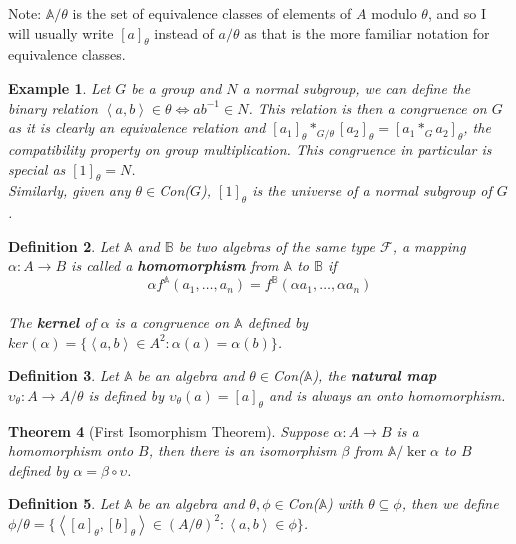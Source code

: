 \documentclass[12pt,a4paper]{article}
\newtheorem{theorem}{Theorem}[section]
\newtheorem{example}[theorem]{Example}
\newtheorem{definition}[theorem]{Definition}
\begin{document}
Note: $\mathbb{A}/\theta$ is the set of equivalence classes of elements of $A$ modulo $\theta$, and so I will usually write $[a]_\theta$ instead of $a/\theta$ as that is the more familiar notation for equivalence classes.

\begin{example}
Let $G$ be a group and $N$ a normal subgroup, we can define the binary relation $ \left<a,b\right> \in\theta\iff ab^{-1}\in N$.
This relation is then a congruence on $G$ as it is clearly an equivalence relation and $[a_1]_\theta*_{G/\theta}[a_2]_\theta=[a_1*_{G}a_2]_\theta$, the compatibility property on group multiplication. This congruence in particular is special as $[1]_\theta=N$.\\
Similarly, given any $\theta\in$Con($G$), $[1]_\theta$ is the universe of a normal subgroup of $G$.
\end{example}

\begin{definition}
Let $\mathbb{A}$ and $\mathbb{B}$ be two algebras of the same type $\mathcal{F}$, a mapping $\alpha:A\to B$ is called a \textbf{homomorphism} from $\mathbb{A}$ to $\mathbb{B}$ if 
\[
\alpha f^\mathbb{A}(a_1,\ldots,a_n)=f^\mathbb{B}(\alpha a_1,\ldots,\alpha a_n)
\]\\
The \textbf{kernel} of $\alpha$ is a congruence on $\mathbb{A}$ defined by $ker(\alpha)=\{ \left<a,b\right> \in A^2:\alpha(a)=\alpha(b)\}$.\\
\end{definition}

\begin{definition}
Let $\mathbb{A}$ be an algebra and $\theta\in$Con($\mathbb{A}$), the \textbf{natural map} $\upsilon_\theta:A\to A/\theta$ is defined by $\upsilon_\theta(a)=[a]_\theta$ and is always an onto homomorphism.
\end{definition}

\begin{theorem}[First Isomorphism Theorem]
Suppose $\alpha:A\to B$ is a homomorphism onto $B$, then there is an isomorphism $\beta$ from $\mathbb{A}/\ker{\alpha}$ to $B$ defined by $\alpha=\beta\circ\upsilon$.
\end{theorem}

\begin{definition}
Let $\mathbb{A}$ be an algebra and $\theta,\phi\in$Con($\mathbb{A}$) with $\theta\subseteq\phi$, then we define $\phi/\theta=\{\left<[a]_\theta,[b]_\theta\right>\in(A/\theta)^2: \left<a,b\right> \in\phi\}$.
\end{definition}
\end{document}

